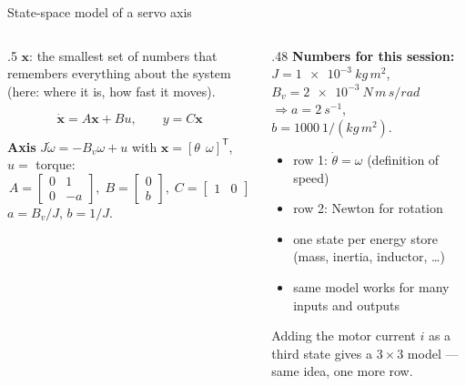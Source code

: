 \documentclass[aspectratio=169,10pt]{beamer}
\begin{document}
\begin{frame}{State-space model of a servo axis}
\begin{columns}[T]
\begin{column}{.5\textwidth}
\small
{} $\bm x$: the smallest set of numbers that remembers everything about the system (here: where it is, how fast it moves).
\begin{eqbox}
\[ \dot{\bm x}=A\bm x+B u,\qquad y=C\bm x \]
\end{eqbox}
\textbf{Axis} $J\dot\omega=-B_v\omega+u$ with $\bm x=[\theta\ \ \omega]^{\mathsf T}$, $u=$ torque:
\[
A=\begin{bmatrix}0&1\\0&-a\end{bmatrix},\;
B=\begin{bmatrix}0\\ b\end{bmatrix},\;
C=\begin{bmatrix}1&0\end{bmatrix}
\]
$a=B_v/J$, $b=1/J$.
\end{column}
\begin{column}{.48\textwidth}
\small
\textbf{Numbers for this session:}\\
$J=\SI{1e-3}{kg\,m^2}$, $B_v=\SI{2e-3}{N\,m\,s/rad}$\\
$\Rightarrow a=\SI{2}{s^{-1}}$, $b=\SI{1000}{1/(kg\,m^2)}$.
\vspace{2mm}
\begin{itemize}\setlength\itemsep{.4mm}
\item row 1: $\dot\theta=\omega$ (definition of speed)
\item row 2: Newton for rotation
\item one state per energy store (mass, inertia, inductor, \dots)
\item same model works for many inputs and outputs
\end{itemize}
\begin{notebox}
Adding the motor current $i$ as a third state gives a $3\times3$ model --- same idea, one more row.
\end{notebox}
\end{column}
\end{columns}
\end{frame}
\end{document}
